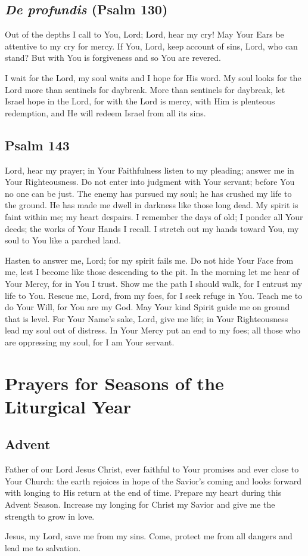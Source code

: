 \documentclass[12pt]{article}
\newcommand{\prayersection}[1]{\section{#1}}
\newcommand{\prayertitle}[1]{\subsection{#1}}
\newcommand{\indulgencedprayertitle}[1]{\prayertitle{#1 \protect\kreuz}}
\newcommand{\emphasis}[1]{\emph{#1}}
\newcommand{\emphasis}[1]{\textsl{#1}}
\newcommand{\foreign}[1]{\emphasis{#1}}
\begin{document}
\indulgencedprayertitle{\foreign{De profundis} (Psalm 130)}
Out of the depths I call to You, Lord;
Lord, hear my cry!
May Your Ears be attentive to my cry for mercy.
If You, Lord, keep account of sins, Lord, who can stand?
But with You is forgiveness and so You are revered.

I wait for the Lord, my soul waits and I hope for His word.
My soul looks for the Lord more than sentinels for daybreak.
More than sentinels for daybreak, let Israel hope in the Lord, for with the Lord is mercy, with Him is plenteous redemption, and He will redeem Israel from all its sins.

\indulgencedprayertitle{Psalm 143}
Lord, hear my prayer;
in Your Faithfulness listen to my pleading;
answer me in Your Righteousness.
Do not enter into judgment with Your servant;
before You no one can be just.
The enemy has pursued my soul;
he has crushed my life to the ground.
He has made me dwell in darkness like those long dead.
My spirit is faint within me;
my heart despairs.
I remember the days of old;
I ponder all Your deeds;
the works of Your Hands I recall.
I stretch out my hands toward You, my soul to You like a parched land.

Hasten to answer me, Lord;
for my spirit fails me.
Do not hide Your Face from me,
lest I become like those descending to the pit.
In the morning let me hear of Your Mercy, for in You I trust.
Show me the path I should walk, for I entrust my life to You.
Rescue me, Lord, from my foes, for I seek refuge in You.
Teach me to do Your Will, for You are my God.
May Your kind Spirit guide me on ground that is level.
For Your Name's sake, Lord, give me life;
in Your Righteousness lead my soul out of distress.
In Your Mercy put an end to my foes;
all those who are oppressing my soul, for I am Your servant.


\newpage

\prayersection{Prayers for Seasons of the Liturgical Year}
\prayertitle{Advent}
Father of our Lord Jesus Christ, ever faithful to Your promises and ever close to Your Church: the earth rejoices in hope of the Savior's coming and looks forward with longing to His return at the end of time.
Prepare my heart during this Advent Season.
Increase my longing for Christ my Savior and give me the strength to grow in love.

Jesus, my Lord, save me from my sins.
Come, protect me from all dangers and lead me to salvation.
\end{document}
